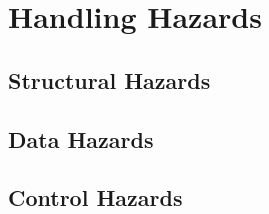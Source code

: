 \section{Handling Hazards}
\subsection{Structural Hazards}
\subsection{Data Hazards}
\subsection{Control Hazards}

